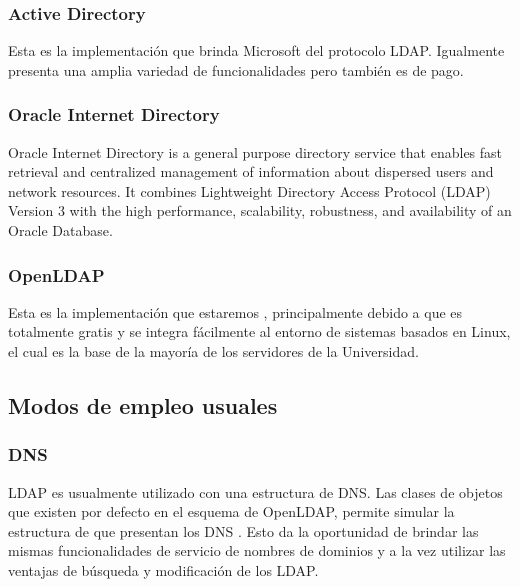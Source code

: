 \subsubsection{Active Directory}
Esta es la implementaci\'on que brinda Microsoft del protocolo LDAP. Igualmente presenta una amplia variedad de funcionalidades pero tambi\'en es de pago.
\subsubsection{Oracle Internet Directory}
Oracle Internet Directory is a general purpose directory service that enables fast retrieval and centralized management of information about dispersed users and network resources. It combines Lightweight Directory Access Protocol (LDAP) Version 3 with the high performance, scalability, robustness, and availability of an Oracle Database. 
\subsubsection{OpenLDAP}
Esta es la implementaci\'on que estaremos , principalmente debido a que es totalmente gratis y se integra f\'acilmente al entorno de sistemas basados en Linux, el cual es la base de la mayor\'ia de los servidores de la Universidad.

\subsection{Modos de empleo usuales}
\subsubsection{DNS}
LDAP es usualmente utilizado con una estructura de DNS. Las clases de objetos que existen por defecto en el esquema de OpenLDAP, permite simular la estructura de que presentan los DNS . Esto da la oportunidad de brindar las mismas funcionalidades de servicio de nombres de dominios y a la vez utilizar las ventajas de b\'usqueda y modificaci\'on de los LDAP.

